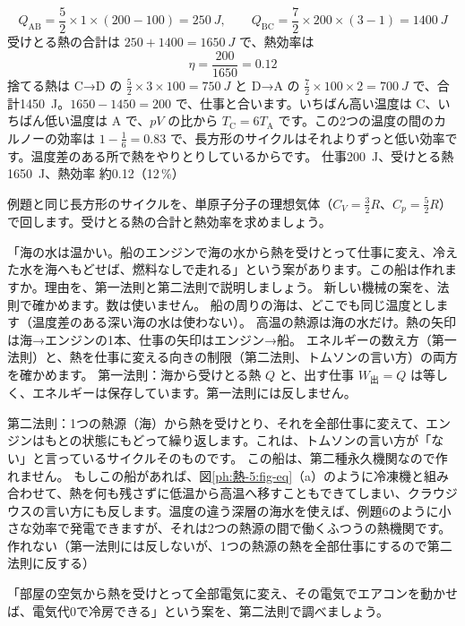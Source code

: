\begin{phreidai}[$p$-$V$ 図の長方形のサイクルの効率]
\[Q_{\mathrm{AB}}=\frac{5}{2}\times1\times(200-100)=\qty{250}{J},\qquad Q_{\mathrm{BC}}=\frac{7}{2}\times200\times(3-1)=\qty{1400}{J}\]
受けとる熱の合計は $250+1400=\qty{1650}{J}$ で、熱効率は
\[\eta=\frac{200}{1650}=0.12\]
\phtashikame
捨てる熱は C→D の $\tfrac{5}{2}\times3\times100=\qty{750}{J}$ と D→A の $\tfrac{7}{2}\times100\times2=\qty{700}{J}$ で、合計\qty{1450}{J}。$1650-1450=200$ で、仕事と合います。いちばん高い温度は C、いちばん低い温度は A で、$pV$ の比から $T_{\mathrm C}=6T_{\mathrm A}$ です。この2つの温度の間のカルノーの効率は $1-\tfrac{1}{6}=0.83$ で、長方形のサイクルはそれよりずっと低い効率です。温度差のある所で熱をやりとりしているからです。
\kotae 仕事\qty{200}{J}、受けとる熱\qty{1650}{J}、熱効率 約0.12（12\,\%）
\end{phreidai}
\begin{jibun}
例題と同じ長方形のサイクルを、単原子分子の理想気体（$C_V=\tfrac{3}{2}R$、$C_p=\tfrac{5}{2}R$）で回します。受けとる熱の合計と熱効率を求めましょう。
\end{jibun}

\label{ph:熱-5:ex13}
\begin{phreidai}[海の熱だけで走る船]
「海の水は温かい。船のエンジンで海の水から熱を受けとって仕事に変え、冷えた水を海へもどせば、燃料なしで走れる」という案があります。この船は作れますか。理由を、第一法則と第二法則で説明しましょう。
\phbamen
新しい機械の案を、法則で確かめます。数は使いません。
\phmushi
船の周りの海は、どこでも同じ温度とします（温度差のある深い海の水は使わない）。
\phzu
高温の熱源は海の水だけ。熱の矢印は海→エンジンの1本、仕事の矢印はエンジン→船。
\phriyu
エネルギーの数え方（第一法則）と、熱を仕事に変える向きの制限（第二法則、トムソンの言い方）の両方を確かめます。
\phtateru
第一法則：海から受けとる熱 $Q$ と、出す仕事 $W_{\text{出}}=Q$ は等しく、エネルギーは保存しています。第一法則には反しません。\par
第二法則：1つの熱源（海）から熱を受けとり、それを全部仕事に変えて、エンジンはもとの状態にもどって繰り返します。これは、トムソンの言い方が「ない」と言っているサイクルそのものです。
\phtoku
この船は、第二種永久機関なので作れません。
\phtashikame
もしこの船があれば、図\ref{ph:熱-5:fig-eq}（a）のように冷凍機と組み合わせて、熱を何も残さずに低温から高温へ移すこともできてしまい、クラウジウスの言い方にも反します。温度の違う深層の海水を使えば、例題6のように小さな効率で発電できますが、それは2つの熱源の間で働くふつうの熱機関です。
\kotae 作れない（第一法則には反しないが、1つの熱源の熱を全部仕事にするので第二法則に反する）
\end{phreidai}
\begin{jibun}
「部屋の空気から熱を受けとって全部電気に変え、その電気でエアコンを動かせば、電気代0で冷房できる」という案を、第二法則で調べましょう。
\end{jibun}

